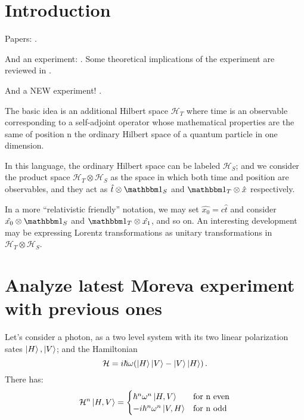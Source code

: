 \section{Introduction}

Papers: \cite{Lloyd:Time, Marletto:Evolution, Prvanovic, Maccone:Pauli, RealisticClocks}.


And an experiment: \cite{Moreva:synthetic,Moreva:illustration}.
Some theoretical implications of the experiment are reviewed in
\cite{LeggettGarg+PageWootters}.

And a NEW experiment! \parencite{Moreva_position}.

The basic idea is an additional Hilbert space $\mathcal{H}_T$ where time is an observable
corresponding to
a self-adjoint operator whose mathematical properties are the same of position  n the
ordinary Hilbert space of a quantum particle in one dimension.

In this language, the ordinary Hilbert space can be labeled $\mathcal{H}_S$;
and we consider the product space $\mathcal{H}_T \otimes \mathcal{H}_S$ as
the space in which both time and position are observables, and they act as
$\hat{t} \otimes \idop_S$ and $\idop_T \otimes \hat{x}$
respectively.

\begin{remark}
  In a more ``relativistic friendly'' notation, we may set
  $\hat{x_0} = c\hat{t}$ and consider
  $\hat{x_0} \otimes \idop_S$ and $\idop_T \otimes \hat{x_1}$,
  and so on. An interesting development may be expressing
  Lorentz transformations as unitary transformations in
  $\mathcal{H}_T \otimes \mathcal{H}_S$.
\end{remark}

\iftodo

\section{Analyze latest Moreva experiment with previous ones}

Let's consider a photon, as a two level system with its two linear polarization
sates $\ket{H}, \ket{V}$;
and the Hamiltonian
\begin{equation}
  \mathcal{H}=i\hbar\omega\qty(\ket{H}\ket{V}-\ket{V}\ket{H})\,\text{.}
\end{equation}
There has:
\[
  \mathcal{H}^n \ket{H, V} = \begin{cases}
      \hbar^n\omega^n\ket{H, V} &\text{for n even} \\
    -i\hbar^n\omega^n\ket{V, H} &\text{for n odd}
  \end{cases}
\]

